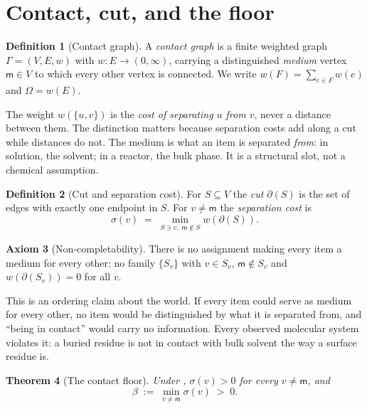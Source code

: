 \documentclass[11pt,twocolumn,a4paper]{article}
\theoremstyle{thmstyle}
\newtheorem{theorem}{Theorem}[section]
\theoremstyle{definition}
\newtheorem{definition}[theorem]{Definition}
\newtheorem{axiom}[theorem]{Axiom}
\theoremstyle{remark}
\newcommand{\Gph}{\Gamma}
\newcommand{\med}{\mathsf{m}}
\newcommand{\flo}{\beta}
\newcommand{\cut}{\partial}
\newcommand{\sepc}{\sigma}
\newcommand{\Tot}{\Omega}
\begin{document}
\section{Contact, cut, and the floor}
\label{sec:substrate}

\begin{definition}[Contact graph]
\label{def:contactgraph}
A \emph{contact graph} is a finite weighted graph $\Gph=(V,E,w)$ with
$w: E \to (0,\infty)$, carrying a distinguished \emph{medium} vertex $\med \in
V$ to which every other vertex is connected. We write $w(F)=\sum_{e\in F}w(e)$
and $\Tot = w(E)$.
\end{definition}

The weight $w(\{u,v\})$ is the \emph{cost of separating $u$ from $v$}, never a
distance between them. The distinction matters because separation costs add
along a cut while distances do not. The medium is what an item is separated
\emph{from}: in solution, the solvent; in a reactor, the bulk phase. It is a
structural slot, not a chemical assumption.

\begin{definition}[Cut and separation cost]
\label{def:cut}
For $S \subseteq V$ the \emph{cut} $\cut(S)$ is the set of edges with exactly
one endpoint in $S$. For $v \neq \med$ the \emph{separation cost} is
\begin{equation}
\sepc(v) \;=\; \min_{S \ni v,\; \med \notin S} w(\cut(S)).
\label{eq:sepcost}
\end{equation}
\end{definition}

\begin{axiom}[Non-completability]
\label{ax:noncomplete}
There is no assignment making every item a medium for every other: no family
$\{S_v\}$ with $v \in S_v$, $\med \notin S_v$ and $w(\cut(S_v))=0$ for all
$v$.
\end{axiom}

This is an ordering claim about the world. If every item could serve as medium
for every other, no item would be distinguished by what it is separated from,
and ``being in contact'' would carry no information. Every observed molecular
system violates it: a buried residue is not in contact with bulk solvent the
way a surface residue is.

\begin{theorem}[The contact floor]
\label{thm:floor}
Under , $\sepc(v)>0$ for every $v \neq \med$, and
\begin{equation}
\flo \;:=\; \min_{v \neq \med} \sepc(v) \;>\; 0 .
\label{eq:floor}
\end{equation}
\end{theorem}
\end{document}
